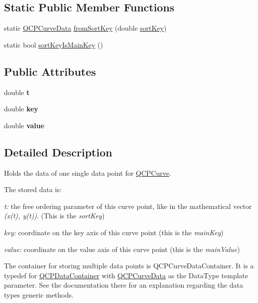 \subsection*{Static Public Member Functions}
\begin{DoxyCompactItemize}
\item 
static \hyperlink{classQCPCurveData}{Q\+C\+P\+Curve\+Data} \hyperlink{classQCPCurveData_a40adf1a6ba93051c415a65298b49aa6e}{from\+Sort\+Key} (double \hyperlink{classQCPCurveData_a5a464c57c73904310db53fa3c6ff8361}{sort\+Key})
\item 
static bool \hyperlink{classQCPCurveData_a1b78f228e31ca40a1e69add44537918c}{sort\+Key\+Is\+Main\+Key} ()
\end{DoxyCompactItemize}
\subsection*{Public Attributes}
\begin{DoxyCompactItemize}
\item 
double {\bfseries t}\hypertarget{classQCPCurveData_aecc395525be28e9178a088793beb3ff3}{}\label{classQCPCurveData_aecc395525be28e9178a088793beb3ff3}

\item 
double {\bfseries key}\hypertarget{classQCPCurveData_a8a4ec5f2b9a396149fd842e309701bd4}{}\label{classQCPCurveData_a8a4ec5f2b9a396149fd842e309701bd4}

\item 
double {\bfseries value}\hypertarget{classQCPCurveData_a72b39b8e1dbf7b45382ebd48419b6828}{}\label{classQCPCurveData_a72b39b8e1dbf7b45382ebd48419b6828}

\end{DoxyCompactItemize}


\subsection{Detailed Description}
Holds the data of one single data point for \hyperlink{classQCPCurve}{Q\+C\+P\+Curve}. 

The stored data is\+: \begin{DoxyItemize}
\item {\itshape t\+:} the free ordering parameter of this curve point, like in the mathematical vector {\itshape (x(t), y(t))}. (This is the {\itshape sort\+Key}) \item {\itshape key\+:} coordinate on the key axis of this curve point (this is the {\itshape main\+Key}) \item {\itshape value\+:} coordinate on the value axis of this curve point (this is the {\itshape main\+Value})\end{DoxyItemize}
The container for storing multiple data points is Q\+C\+P\+Curve\+Data\+Container. It is a typedef for \hyperlink{classQCPDataContainer}{Q\+C\+P\+Data\+Container} with \hyperlink{classQCPCurveData}{Q\+C\+P\+Curve\+Data} as the Data\+Type template parameter. See the documentation there for an explanation regarding the data type\textquotesingle{}s generic methods.

